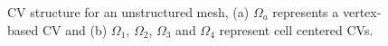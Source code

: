 \begin{figure}
\begin{center}
 \caption{CV structure for an unstructured mesh, (a) $\Omega_a$
 represents a vertex-based CV and (b) $\Omega_1$, $\Omega_2$,
 $\Omega_3$ and $\Omega_4$ represent cell centered CVs. }
 \label{fig:vc-cc-fv}
\end{center}
\end{figure}

